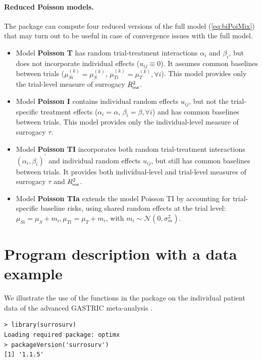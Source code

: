\documentclass[]{scrartcl}\usepackage[]{graphicx}\usepackage[]{color}
\begin{document}
{{%
\paragraph{Reduced Poisson models.}
The  package can compute four reduced versions 
  of the full model (\ref{eq:biPoiMix})
  that may turn out to be useful in case of convergence issues with the full model.
\begin{itemize}
\item Model \textbf{Poisson T} has
  random trial-treatment interactions $\alpha_i$ and $\beta_i$,
  but does not incorporate individual effects ($u_{ij} \equiv 0$).
It assumes common baselines between trials
($\mu^{(k)}_{Si} = \mu^{(k)}_{S}$, $\mu^{(k)}_{Ti} = \mu^{(k)}_{T},
\forall i$).
This model provides only the trial-level measure of surrogacy
$R^2_{\textsf{\tiny trial}}$.

\item Model \textbf{Poisson I} contains individual random effects $u_{ij}$,
but not the trial-specific treatment effects 
($\alpha_i = \alpha$, $\beta_i = \beta, \forall i$)
and has common baselines between trials.
This model provides only the individual-level measure of surrogacy
$\tau$.

\item Model \textbf{Poisson TI} incorporates
both random trial-treatment interactions
$(\alpha_i, \beta_i)^\prime$
and individual random effects $u_{ij}$,
but still has common baselines between trials.
It provides both individual-level and trial-level measures of surrogacy
$\tau$ and $R^2_{\textsf{\tiny trial}}$.

\item Model \textbf{Poisson TIa} extends the model Poisson TI
by accounting for trial-specific baseline risks,
using shared random effects at the trial level:
$\mu_{Si} = \mu_S + m_i, \mu_{Ti} = \mu_T + m_i$,
with $m_i\sim\mathcal N(0, \sigma^2_m)$.
\end{itemize}



\section{Program description with a data example}
We illustrate the use of the functions in the  package
  on the individual patient data of the advanced GASTRIC meta-analysis
\citep{GASTRIC13, Paoletti2013}.
\begin{lstlisting}
> library(surrosurv)
Loading required package: optimx
> packageVersion('surrosurv')
[1] '1.1.5'
\end{lstlisting}

}}
\end{document}
